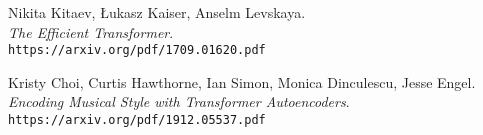 \begin{thebibliography}{9}
	Nikita Kitaev, Łukasz Kaiser, Anselm Levskaya.
	\\\textit{The Efficient Transformer}.
	\\\texttt{https://arxiv.org/pdf/1709.01620.pdf}
	
	Kristy Choi, Curtis Hawthorne, Ian Simon, Monica Dinculescu, Jesse Engel.
	\\\textit{Encoding Musical Style with Transformer Autoencoders}.
	\\\texttt{https://arxiv.org/pdf/1912.05537.pdf}
\end{thebibliography}



